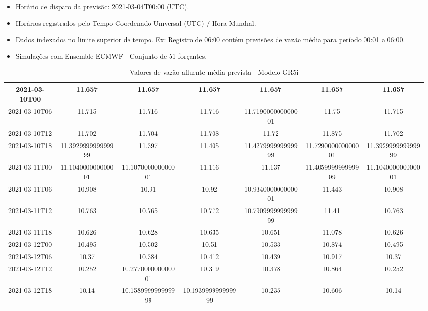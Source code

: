 \documentclass[a4paper,12pt]{article}
\begin{document}
\begin{itemize}
    \item Horário de disparo da previsão: 2021-03-04T00:00 (UTC).
    \item Horários registrados pelo Tempo Coordenado Universal (UTC) / Hora Mundial.
    \item Dados indexados no limite superior de tempo. Ex: Registro de 06:00 contém previsões de vazão média para período 00:01 a 06:00.
    \item Simulações com Ensemble ECMWF - Conjunto de 51 forçantes.
\end{itemize}

\newpage
\begin{table}[ht]
    \centering
    \caption{Valores de vazão afluente média prevista - Modelo GR5i}
    \vspace{6pt}
    \begin{tabular}{|c|c|c|c|c|c|c|}
        \hline
        2021-03-10T00 & 11.657 & 11.657 & 11.657 & 11.657 & 11.657 & 11.657 \\
        \hline
        2021-03-10T06 & 11.715 & 11.716 & 11.716 & 11.719000000000001 & 11.75 & 11.715 \\
        \hline
        2021-03-10T12 & 11.702 & 11.704 & 11.708 & 11.72 & 11.875 & 11.702 \\
        \hline
        2021-03-10T18 & 11.392999999999999 & 11.397 & 11.405 & 11.427999999999999 & 11.729000000000001 & 11.392999999999999 \\
        \hline
        2021-03-11T00 & 11.104000000000001 & 11.107000000000001 & 11.116 & 11.137 & 11.405999999999999 & 11.104000000000001 \\
        \hline
        2021-03-11T06 & 10.908 & 10.91 & 10.92 & 10.934000000000001 & 11.443 & 10.908 \\
        \hline
        2021-03-11T12 & 10.763 & 10.765 & 10.772 & 10.790999999999999 & 11.41 & 10.763 \\
        \hline
        2021-03-11T18 & 10.626 & 10.628 & 10.635 & 10.651 & 11.078 & 10.626 \\
        \hline
        2021-03-12T00 & 10.495 & 10.502 & 10.51 & 10.533 & 10.874 & 10.495 \\
        \hline
        2021-03-12T06 & 10.37 & 10.384 & 10.412 & 10.439 & 10.917 & 10.37 \\
        \hline
        2021-03-12T12 & 10.252 & 10.277000000000001 & 10.319 & 10.378 & 10.864 & 10.252 \\
        \hline
        2021-03-12T18 & 10.14 & 10.158999999999999 & 10.193999999999999 & 10.235 & 10.606 & 10.14 \\

\end{tabular}
\end{table}
\end{document}
